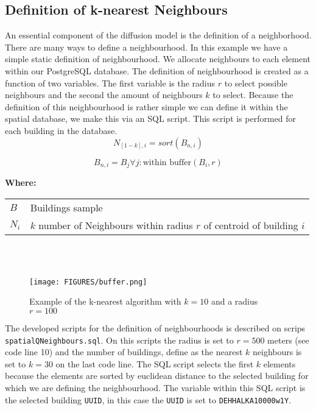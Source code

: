 \subsection{Definition of k-nearest Neighbours}

An essential component of the diffusion model is the definition of a
neighborhood. There are many ways to define a neighbourhood. In this example we
have a simple static definition of neighbourhood. We allocate neighbours to
each element within our PostgreSQL database. The definition of neighbourhood is
created as a function of two variables. The first variable is the radius
$r$ to select possible neighbours and the second the amount of neighbours
$k$ to select. Because the definition of this neighbourhood is rather simple we
can define it within the spatial database, we make this via an SQL script. This
script is performed for each building in the database.\\

\begin{equation}\label{eq:k-nearest}
    N_{[1-k],i} = sort(B_{n, i}) 
\end{equation}

\begin{equation}\label{eq:neighbours}
    B_{n, i} = B_j \forall j: \text{within~buffer} (B_i, r)
\end{equation}

\noindent
\textbf{Where:}\vspace{.3cm} \\
\begin{tabular}{lp{15cm}}
    $B$   & Buildings sample\\
    $N_i$   & $k$ number of Neighbours within radius $r$ of centroid of building
    $i$\\
\end{tabular}\\ \\

\begin{figure}[htb]
    \centering
    \texttt{[image: FIGURES/buffer.png]}
    \caption{Example of the k-nearest algorithm with $k=10$ and a radius
    $r=100$}\label{fig:k-nearest}
\end{figure}

The developed scripts for the definition of neighbourhoods is described on
scrips \verb|spatialQNeighbours.sql|. On this scripts the radius is set to
$r=500$ meters (see code line 10) and the number of buildings, define as the
nearest $k$ neighbours is set to $k=30$ on the last code line. The SQL script
selects the first $k$ elements because the elements are sorted by euclidean
distance to the selected building for which we are defining the neighbourhood.
The variable within this SQL script is the selected building \verb|UUID|, in
this case the \verb|UUID| is set to \verb|DEHHALKA10000w1Y|.\\


